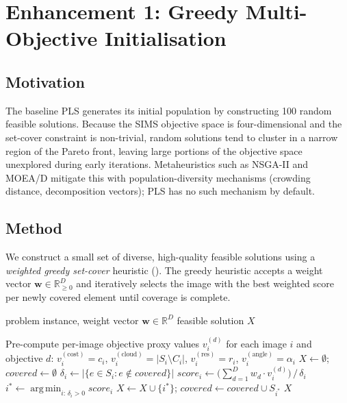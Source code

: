 \documentclass[11pt,a4paper]{article}
\newcommand{\bbR}{\mathbb{R}}
\DeclareMathOperator*{\argmin}{arg\,min}
\begin{document}
\section{Enhancement 1: Greedy Multi-Objective Initialisation}
\label{sec:greedy}

\subsection{Motivation}

The baseline PLS generates its initial population by constructing 100
random feasible solutions.  Because the SIMS objective space is
four-dimensional and the set-cover constraint is non-trivial, random
solutions tend to cluster in a narrow region of the Pareto front,
leaving large portions of the objective space unexplored during early
iterations.  Metaheuristics such as NSGA-II and MOEA/D mitigate this
with population-diversity mechanisms (crowding distance, decomposition
vectors); PLS has no such mechanism by default.

\subsection{Method}

We construct a small set of diverse, high-quality feasible solutions
using a \emph{weighted greedy set-cover} heuristic
().  The greedy heuristic accepts a weight vector
$\mathbf{w} \in \bbR^D_{\ge 0}$ and iteratively selects the image with
the best weighted score per newly covered element until coverage is
complete.

\begin{algorithm}[t]
\caption{Weighted Greedy Set-Cover Construction}\label{alg:greedy}
\begin{algorithmic}[1]
\Input problem instance, weight vector $\mathbf{w} \in \bbR^D$
\Output feasible solution $X$

\State Pre-compute per-image objective proxy values $v_i^{(d)}$ for
  each image $i$ and objective $d$:
  \Statex \quad $v_i^{(\text{cost})} = c_i$, \;
    $v_i^{(\text{cloud})} = |S_i \setminus C_i|$, \;
    $v_i^{(\text{res})} = r_i$, \;
    $v_i^{(\text{angle})} = \alpha_i$
\State $X \gets \emptyset$; \quad $\textit{covered} \gets \emptyset$
    \State $\delta_i \gets |\{e \in S_i : e \notin \textit{covered}\}|$
      \State $\textit{score}_i \gets
        \bigl(\sum_{d=1}^{D} w_d \cdot v_i^{(d)}\bigr) \,/\, \delta_i$
    \EndIf
  \EndFor
  \State $i^* \gets \argmin_{i:\,\delta_i>0} \textit{score}_i$
  \State $X \gets X \cup \{i^*\}$; \quad
    $\textit{covered} \gets \textit{covered} \cup S_{i^*}$
\EndWhile
\State \Return $X$
\end{algorithmic}
\end{algorithm}
\end{document}
